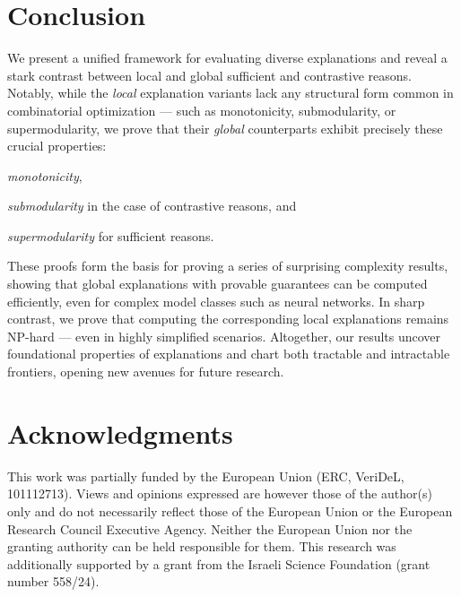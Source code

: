 \documentclass{article}
\begin{document}
\section{Conclusion}
We present a unified framework for evaluating diverse explanations and reveal a stark contrast between local and global sufficient and contrastive reasons. Notably, while the \emph{local} explanation variants lack any structural form common in combinatorial optimization --- such as monotonicity, submodularity, or supermodularity, we prove that their \emph{global} counterparts exhibit precisely these crucial properties: \begin{inparaenum}[(i)] \item \emph{monotonicity}, \item \emph{submodularity} in the case of contrastive reasons, and \item \emph{supermodularity} for sufficient reasons. \end{inparaenum} These proofs form the basis for proving a series of surprising complexity results, showing that global explanations with provable guarantees can be computed efficiently, even for complex model classes such as neural networks. In sharp contrast, we prove that computing the corresponding local explanations remains NP-hard --- even in highly simplified scenarios. Altogether, our results uncover foundational properties of explanations and chart both tractable and intractable frontiers, opening new avenues for future research.

\section*{Acknowledgments}

This work was partially funded by the European Union
(ERC, VeriDeL, 101112713). Views and opinions expressed
are however those of the author(s) only and do not necessarily reflect those of the European Union or the European
Research Council Executive Agency. Neither the European
Union nor the granting authority can be held responsible for
them. This research was additionally supported by a grant
from the Israeli Science Foundation (grant number 558/24).
\end{document}
